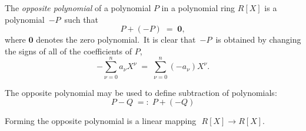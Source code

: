 \documentclass[12pt]{article}
\begin{document}
The {\em opposite polynomial} of a polynomial $P$ in a polynomial ring $R[X]$ is a polynomial \,$-P$\, such that
                     $$P\!+\!(-P) \;=\; \textbf{0},$$
where $\textbf{0}$ denotes the zero polynomial. \,It is clear that \,$-P$\, is obtained by changing the signs of all of the coefficients of $P$, 
  $$-\sum_{\nu = 0}^n a_\nu X^\nu \;=\; \sum_{\nu = 0}^n (-a_\nu)X^\nu.$$

The opposite polynomial may be used to define subtraction of polynomials:
                         $$P\!-\!Q \;=:\; P\!+\!(-Q)$$

Forming the opposite polynomial is a linear mapping \,\,$R[X]\to R[X]$.
\end{document}
